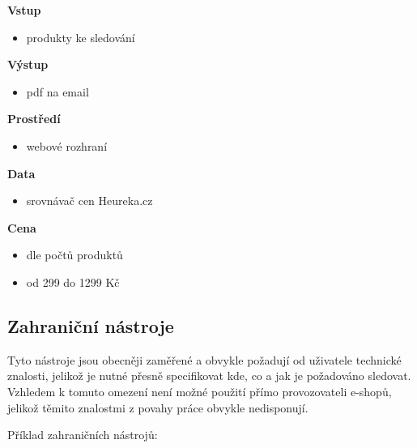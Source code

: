 \documentclass[thesis=B,czech]{FITthesis}[2012/06/26]
\begin{document}
\textbf{Vstup}
\begin{itemize}
\item produkty ke sledování
\end{itemize}

\textbf{Výstup}
\begin{itemize}
\item pdf na email
\end{itemize}

\textbf{Prostředí}
\begin{itemize}
\item webové rozhraní
\end{itemize}

\textbf{Data}
\begin{itemize}
\item srovnávač cen Heureka.cz
\end{itemize}

\textbf{Cena}
\begin{itemize}
\item dle počtů produktů
\item od 299 do 1299 Kč
\end{itemize}

\newpage

\subsection{Zahraniční nástroje}
Tyto nástroje jsou obecněji zaměřené a obvykle požadují od uživatele technické znalosti, 
jelikož je nutné přesně specifikovat kde, co a jak je požadováno sledovat. Vzhledem k tomuto omezení není možné
použití přímo provozovateli e-shopů, jelikož těmito znalostmi z povahy práce obvykle nedisponují.
\par
Příklad zahraničních nástrojů:
\end{document}
